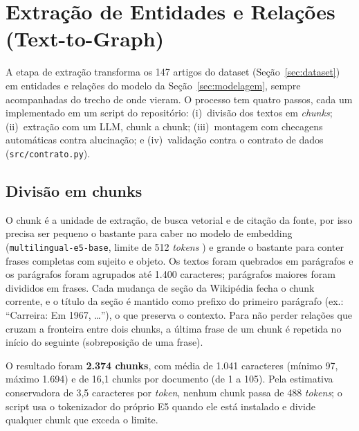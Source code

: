 %

\section{Extração de Entidades e Relações (Text-to-Graph)}
\label{sec:extracao}

A etapa de extração transforma os 147 artigos do dataset (Seção~\ref{sec:dataset}) em entidades e relações do modelo da Seção~\ref{sec:modelagem}, sempre acompanhadas do trecho de onde vieram. O processo tem quatro passos, cada um implementado em um script do repositório: (i)~divisão dos textos em \emph{chunks}; (ii)~extração com um LLM, chunk a chunk; (iii)~montagem com checagens automáticas contra alucinação; e (iv)~validação contra o contrato de dados (\texttt{src/contrato.py}).

\subsection{Divisão em chunks}

O chunk é a unidade de extração, de busca vetorial e de citação da fonte, por isso precisa ser pequeno o bastante para caber no modelo de embedding (\texttt{multilingual-e5-base}, limite de 512 \emph{tokens} \cite{wang2024me5}) e grande o bastante para conter frases completas com sujeito e objeto. Os textos foram quebrados em parágrafos e os parágrafos foram agrupados até 1.400 caracteres; parágrafos maiores foram divididos em frases. Cada mudança de seção da Wikipédia fecha o chunk corrente, e o título da seção é mantido como prefixo do primeiro parágrafo (ex.: ``Carreira: Em 1967, \ldots''), o que preserva o contexto. Para não perder relações que cruzam a fronteira entre dois chunks, a última frase de um chunk é repetida no início do seguinte (sobreposição de uma frase).

O resultado foram \textbf{2.374 chunks}, com média de 1.041 caracteres (mínimo 97, máximo 1.694) e de 16,1 chunks por documento (de 1 a 105). Pela estimativa conservadora de 3,5 caracteres por \emph{token}, nenhum chunk passa de 488 \emph{tokens}; o script usa o tokenizador do próprio E5 quando ele está instalado e divide qualquer chunk que exceda o limite.

